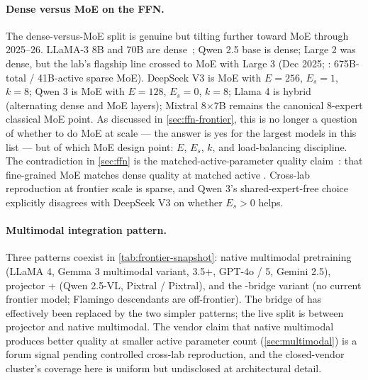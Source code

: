 \paragraph{Dense versus MoE on the FFN.}
The dense-versus-MoE split is genuine but tilting further toward MoE
through 2025--26. LLaMA-3 8B and 70B are dense~\citep{meta-llama3};
Qwen 2.5 base is dense;  Large 2 was dense, but the lab's
flagship line crossed to MoE with  Large 3 (Dec 2025;
\citealp{mistral-large3-2025}: 675B-total / 41B-active sparse MoE).
DeepSeek V3 is MoE with $E = 256$, $E_s = 1$, $k = 8$; Qwen 3 is MoE
with $E = 128$, $E_s = 0$, $k = 8$; Llama 4 is hybrid (alternating
dense and MoE layers); Mixtral 8$\times$7B remains the canonical
8-expert classical MoE point. As discussed in
\cref{sec:ffn-frontier}, this is no longer a question of whether
to do MoE at scale --- the answer is yes for the largest models in
this list --- but of which MoE design point: $E$, $E_s$, $k$, and
load-balancing discipline. The contradiction in
\cref{sec:ffn} is the matched-active-parameter quality
claim~\citep{deepseek-v3,deepseekmoe2024}: that fine-grained MoE
matches dense quality at matched active . Cross-lab
reproduction at frontier scale is sparse, and Qwen 3's
shared-expert-free choice~\citep{qwen3} explicitly disagrees with
DeepSeek V3 on whether $E_s > 0$ helps.

\paragraph{Multimodal integration pattern.}
Three patterns coexist in \cref{tab:frontier-snapshot}: native
multimodal pretraining (LLaMA 4, Gemma 3 multimodal variant,
 3.5+, GPT-4o / 5, Gemini 2.5), projector + 
(Qwen 2.5-VL, Pixtral /  Pixtral), and the
-bridge variant (no current frontier model; Flamingo
descendants are off-frontier). The  bridge of
\citet{alayrac2022-flamingo} has effectively been replaced by the
two simpler patterns; the live split is between projector and
native multimodal. The vendor claim that native multimodal produces
better quality at smaller active parameter count
(\cref{sec:multimodal}) is a forum signal pending controlled
cross-lab reproduction, and the closed-vendor cluster's coverage
here is uniform but undisclosed at architectural detail.

